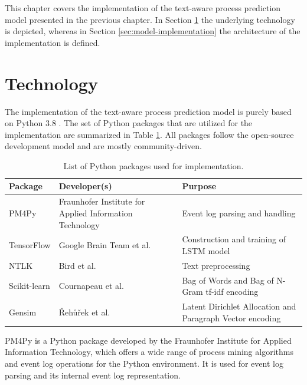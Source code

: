 This chapter covers the implementation of the text-aware process prediction model presented in the previous chapter.
In Section \ref{sec:technology} the underlying technology is depicted, whereas in Section \ref{sec:model-implementation} the architecture of the implementation is defined.

\section{Technology}\label{sec:technology}

The implementation of the text-aware process prediction model is purely based on Python 3.8 \cite{python}.
The set of Python packages that are utilized for the implementation are summarized in Table \ref{tab:packages}.
All packages follow the open-source development model and are mostly community-driven.

\begin{table}[!htbp]
	\begin{tabularx}{\textwidth}{l p{4.5cm} p{6.6cm} }
		\toprule
		\textbf{Package} & \textbf{Developer(s)} & \textbf{Purpose}  \\
		\midrule
		PM4Py \cite{DBLP:journals/corr/abs-1905-06169}   &  Fraunhofer Institute for Applied Information Technology &  Event log parsing and handling\\
		TensorFlow \cite{DBLP:journals/corr/AbadiABBCCCDDDG16} &  Google Brain Team et al.& Construction and training of LSTM model \\
		NTLK \cite{DBLP:books/daglib/0022921} & Bird et al. & Text preprocessing\\
		Scikit-learn \cite{DBLP:journals/jmlr/PedregosaVGMTGBPWDVPCBPD11} & Cournapeau et al.& Bag of Words and Bag of N-Gram tf-idf encoding \\
		Gensim \cite{rehurek_lrec} & Řehůřek et al. & Latent Dirichlet Allocation and Paragraph Vector encoding \\
		 \bottomrule
	\end{tabularx}
	\caption[List of Python packages used for implementation]{List of Python packages used for implementation.}
	\label{tab:packages}
\end{table}

PM4Py \cite{DBLP:journals/corr/abs-1905-06169} is a Python package developed by the Fraunhofer Institute for Applied Information Technology, which offers a wide range of process mining algorithms and event log operations for the Python environment.
It is used for event log parsing and its internal event log representation.

